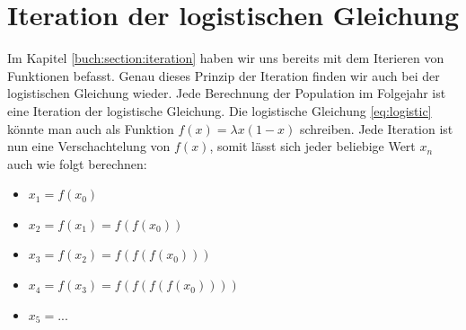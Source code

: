 %
%
%
\section{Iteration der logistischen Gleichung
\label{logistic:section:analyse}}

Im Kapitel \ref{buch:section:iteration} haben wir uns
bereits mit dem Iterieren von Funktionen befasst. 
Genau dieses Prinzip der Iteration finden wir auch bei
der logistischen Gleichung wieder. 
Jede Berechnung der Population im Folgejahr ist 
eine Iteration der logistische Gleichung.
Die logistische Gleichung \eqref{eq:logistic} könnte man 
auch als Funktion $f(x) = \lambda x(1-x)$ schreiben.
Jede Iteration ist nun eine Verschachtelung von $f(x)$,
somit lässt sich jeder beliebige Wert $x_n$ auch wie folgt berechnen:  
\begin{itemize}
    \item $x_1 = f(x_0)$
    \item $x_2 = f(x_1) = f(f(x_0))$
    \item $x_3 = f(x_2) = f(f(f(x_0)))$
    \item $x_4 = f(x_3) = f(f(f(f(x_0))))$
    \item $x_5 = ...$
\end{itemize}

